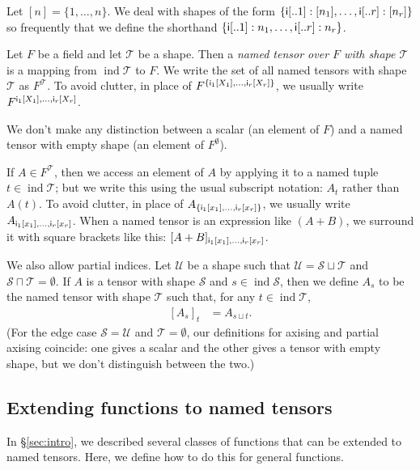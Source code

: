 \documentclass{article}
\newcommand{\tuple}[1]{\{#1\}}
\DeclareMathOperator{\tupleshape}{ind}
\begin{document}
Let $[n] = \{1, \ldots, n\}$. We deal with shapes of the form $\tuple{\nset{i}{..1}: [n_1], \ldots, \nset{i}{..r}: [n_r]}$ so frequently that we define the shorthand $\tuple{\nset{i}{..1}: n_1, \ldots, \nset{i}{..r}: n_r}$.

Let $F$ be a field and let $\mathcal{T}$ be a shape. Then a \emph{named tensor over $F$ with shape $\mathcal{T}$} is a mapping from $\tupleshape \mathcal{T}$ to $F$. We write the set of all named tensors with shape $\mathcal{T}$ as $F^{\mathcal{T}}$. To avoid clutter, in place of $F^{\tuple{\nset{i\sub{1}}{X_1}, \ldots, \nset{i\sub{r}}{X_r}}}$, we usually write $F^{\mathsf{i_\text{$1$}}[X_1], \ldots, \mathsf{i_\text{$r$}}[X_r]}$.

We don't make any distinction between a scalar (an element of $F$) and a named tensor with empty shape (an element of $F^\emptyset$).

If $A \in F^{\mathcal{T}}$, then we access an element of $A$ by applying it to a named tuple $t \in \tupleshape\mathcal{T}$; but we write this using the usual subscript notation: $A_t$ rather than $A(t)$. To avoid clutter, in place of $A_{\tuple{\nidx{i\sub{1}}{x_1}, \ldots, \nidx{i\sub{r}}{x_r}}}$, we usually write $A_{\mathsf{i_\text{$1$}}[x_1], \ldots, \mathsf{i_\text{$r$}}[x_r]}$. When a named tensor is an expression like $(A+B)$, we surround it with square brackets like this: $[A+B]_{\mathsf{i_\text{$1$}}[x_1], \ldots, \mathsf{i_\text{$r$}}[x_r]}$.

We also allow partial indices. Let $\mathcal{U}$ be a shape such that $\mathcal{U} = \mathcal{S} \sqcup \mathcal{T}$ and $\mathcal{S} \sqcap \mathcal{T} = \emptyset$.
If $A$ is a tensor with shape $\mathcal{S}$ and $s \in \tupleshape \mathcal{S}$, then we define $A_s$ to be the named tensor with shape $\mathcal{T}$ such that, for any $t \in \tupleshape \mathcal{T}$,
\begin{align*}
\left[A_s\right]_t &= A_{s \sqcup t}.
\end{align*}
(For the edge case $\mathcal{S} = \mathcal{U}$ and $\mathcal{T} = \emptyset$, our definitions for axising and partial axising coincide: one gives a scalar and the other gives a tensor with empty shape, but we don't distinguish between the two.)

\subsection{Extending functions to named tensors}
\label{sec:tensorfunctions}

In \S\ref{sec:intro}, we described several classes of functions that can be extended to named tensors. Here, we define how to do this for general functions.
\end{document}
